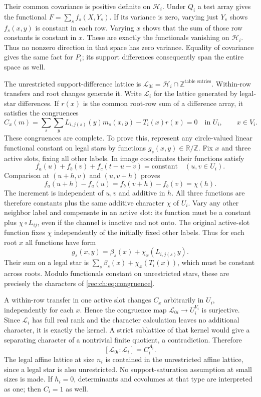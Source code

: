 \documentclass[11pt]{article}
\theoremstyle{definition}
\theoremstyle{remark}
\newcommand{\1}{\mathbf 1}
\begin{document}
Their common covariance is positive definite on $\mathcal H_i$. Under $Q_i$ a test array gives the functional $F=\sum_s f_s(X,Y_s)$. If its variance is zero, varying just $Y_s$ shows $f_s(x,y)$ is constant in each row. Varying $x$ shows that the sum of those row constants is constant in $x$. These are exactly the functionals vanishing on $\mathcal H_i$. Thus no nonzero direction in that space has zero variance. Equality of covariance gives the same fact for $P_i$; its support differences consequently span the entire space as well.

The unrestricted support-difference lattice is $\mathcal L_{0i}=\mathcal H_i\cap\mathbb Z^{\text{table entries}}$. Within-row transfers and root changes generate it. Write $\mathcal L_i$ for the lattice generated by legal-star differences. If $r(x)$ is the common root-row sum of a difference array, it satisfies the congruences
\begin{equation}\label{rec:ch:eq:congruence}
 C_x(m)=\sum_s\sum_yL_{i,j(s)}(y)m_s(x,y)-T_i(x)r(x)=0
 \quad\text{in }U_i,\qquad x\in V_i.
\end{equation}
These congruences are complete. To prove this, represent any circle-valued linear functional constant on legal stars by functions $g_s(x,y)\in\mathbb R/\mathbb Z$. Fix $x$ and three active slots, fixing all other labels. In image coordinates their functions satisfy
\[
 f_a(u)+f_b(v)+f_c(t-u-v)=\text{constant}\quad(u,v\in U_i).
\]
Comparison at $(u+h,v)$ and $(u,v+h)$ proves
\[
 f_a(u+h)-f_a(u)=f_b(v+h)-f_b(v)=\chi(h).
\]
The increment is independent of $u,v$ and additive in $h$. All three functions are therefore constants plus the same additive character $\chi$ of $U_i$. Vary any other neighbor label and compensate in an active slot: its function must be a constant plus $\chi\circ L_{ij}$, even if the channel is inactive and not onto. The original active-slot function fixes $\chi$ independently of the initially fixed other labels. Thus for each root $x$ all functions have form
\[
 g_s(x,y)=\beta_s(x)+\chi_x(L_{i,j(s)}y).
\]
Their sum on a legal star is $\sum_s\beta_s(x)+\chi_x(T_i(x))$, which must be constant across roots. Modulo functionals constant on unrestricted stars, these are precisely the characters of \eqref{rec:ch:eq:congruence}.

A within-row transfer in one active slot changes $C_x$ arbitrarily in $U_i$, independently for each $x$. Hence the congruence map $\mathcal L_{0i}\to U_i^{V_i}$ is surjective. Since $\mathcal L_i$ has full real rank and the character calculation leaves no additional character, it is exactly the kernel. A strict sublattice of that kernel would give a separating character of a nontrivial finite quotient, a contradiction. Therefore
\begin{equation}\label{rec:ch:eq:localindex}
 [\mathcal L_{0i}:\mathcal L_i]=C_i^{A_i}.
\end{equation}
The legal affine lattice at size $n_i$ is contained in the unrestricted affine lattice, since a legal star is also unrestricted. No support-saturation assumption at small sizes is made. If $h_i=0$, determinants and covolumes at that type are interpreted as one; then $C_i=1$ as well.
\end{document}
